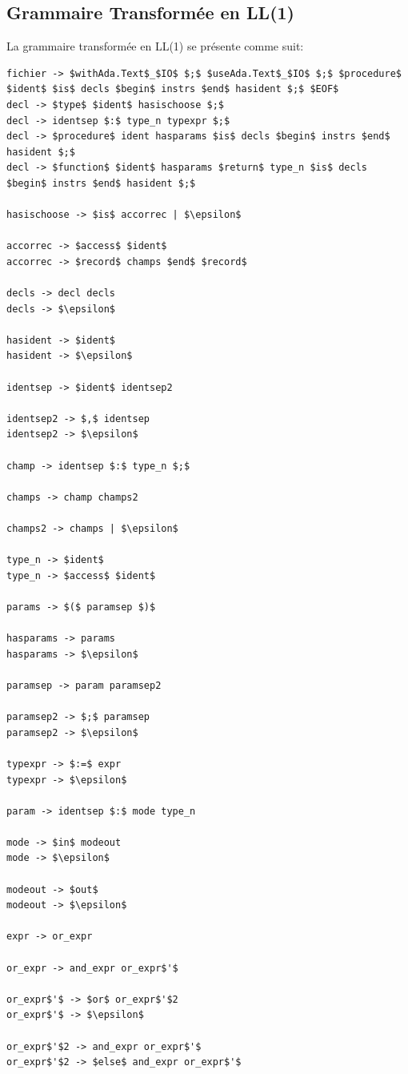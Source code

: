 \documentclass[french,a4paper]{article}
\begin{document}
    \subsection{Grammaire Transformée en LL(1)}\label{subsec:grammaire-transformee-en-ll(1)}
    La grammaire transformée en LL(1) se présente comme suit:
    \begin{lstlisting}[label={lst:lstlisting9}]
fichier -> $withAda.Text$_$IO$ $;$ $useAda.Text$_$IO$ $;$ $procedure$ $ident$ $is$ decls $begin$ instrs $end$ hasident $;$ $EOF$
decl -> $type$ $ident$ hasischoose $;$
decl -> identsep $:$ type_n typexpr $;$
decl -> $procedure$ ident hasparams $is$ decls $begin$ instrs $end$ hasident $;$
decl -> $function$ $ident$ hasparams $return$ type_n $is$ decls $begin$ instrs $end$ hasident $;$

hasischoose -> $is$ accorrec | $\epsilon$

accorrec -> $access$ $ident$
accorrec -> $record$ champs $end$ $record$

decls -> decl decls
decls -> $\epsilon$

hasident -> $ident$
hasident -> $\epsilon$

identsep -> $ident$ identsep2

identsep2 -> $,$ identsep
identsep2 -> $\epsilon$

champ -> identsep $:$ type_n $;$

champs -> champ champs2

champs2 -> champs | $\epsilon$

type_n -> $ident$
type_n -> $access$ $ident$

params -> $($ paramsep $)$

hasparams -> params
hasparams -> $\epsilon$

paramsep -> param paramsep2

paramsep2 -> $;$ paramsep
paramsep2 -> $\epsilon$

typexpr -> $:=$ expr
typexpr -> $\epsilon$

param -> identsep $:$ mode type_n

mode -> $in$ modeout
mode -> $\epsilon$

modeout -> $out$
modeout -> $\epsilon$

expr -> or_expr

or_expr -> and_expr or_expr$'$

or_expr$'$ -> $or$ or_expr$'$2
or_expr$'$ -> $\epsilon$

or_expr$'$2 -> and_expr or_expr$'$
or_expr$'$2 -> $else$ and_expr or_expr$'$


\end{lstlisting}
\end{document}
